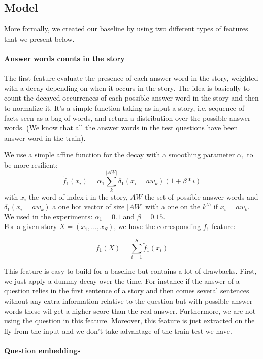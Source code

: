\documentclass[twoside,11pt]{article}
\begin{document}
\subsection{Model}
More formally, we created our baseline by using two different types of features that we present below.
\paragraph{Answer words counts in the story}
The first feature evaluate the presence of each answer word in the story, weighted with a decay depending on when it occurs in the story. The idea is basically to count the decayed occurrences of each possible answer word in the story and then to normalize it. It's a simple function taking as input a story, i.e. sequence of facts seen as a bag of words, and return a distribution over the possible answer words. (We know that all the answer words in the test questions have been answer word in the train).

\noindent We use a simple affine function for the decay with a smoothing parameter $\alpha_1$ to be more resilient: $$\tilde{f}_1(x_i) = \alpha_1 \sum_k^{|AW|}\delta_1(x_i = aw_k)(1 + \beta * i)$$
with $x_i$ the word of index i in the story, $AW$ the set of possible answer words and $\delta_1(x_i = aw_k)$ a one hot vector of size $|AW|$ with a one on the $k^{th}$ if $x_i = aw_k$. We used in the experiments: $\alpha_1 = 0.1$ and $\beta = 0.15$. \\

\noindent For a given story $X=(x_1, ..., x_S)$, we have the corresponding $f_1$ feature:

\[
f_1(X) = \sum_{i=1}^S\tilde{f}_1(x_i)
\]

\noindent This feature is easy to build for a baseline but contains a lot of drawbacks. First, we just apply a dummy decay over the time. For instance if the answer of a question relies in the first sentence of a story and then comes several sentences without any extra information relative to the question but with possible answer words these wil get a higher score than the real answer. Furthermore, we are not using the question in this feature. Moreover, this feature is just extracted on the fly from the input and we don't take advantage of the train test we have. 

\paragraph{Question embeddings}
\end{document}
